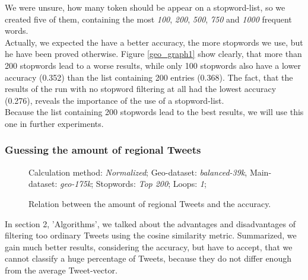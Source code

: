 \documentclass[../Main.tex]{subfiles}
\begin{document}
We were unsure, how many token should be appear on a stopword-list, so we created five of them, containing the most \emph{100}, \emph{200}, \emph{500}, \emph{750} and \emph{1000} frequent words.\\
Actually, we expected the have a better accuracy, the more stopwords we use, but he have been proved otherwise. 
Figure \ref{geo_graph1} show clearly, that more than 200 stopwords lead to a worse results, while only 100 stopwords also have a lower accuracy (0.352) than the list containing 200 entries (0.368). The fact, that the results of the run with no stopword filtering at all had the lowest accuracy (0.276), reveals the importance of the use of a stopword-list.\\
Because the list containing 200 stopwords lead to the best results, we will use this one in further experiments.

\subsubsection{Guessing the amount of regional Tweets}
\begin{figure}
Calculation method: \textit{Normalized}; Geo-dataset: \textit{balanced-39k}, Main-dataset: \textit{geo-175k}; Stopwords: \textit{Top 200}; Loops: \textit{1}; 

  \caption{Relation between the amount of regional Tweets and the accuracy.}
  \label{geo_graph2}
\end{figure}
In section 2, 'Algorithms', we talked about the advantages and disadvantages of filtering too ordinary Tweets using the cosine similarity metric. Summarized, we gain much better results, considering the accuracy, but have to accept, that we cannot classify a huge percentage of Tweets, because they do not differ enough from the average Tweet-vector.
\end{document}
